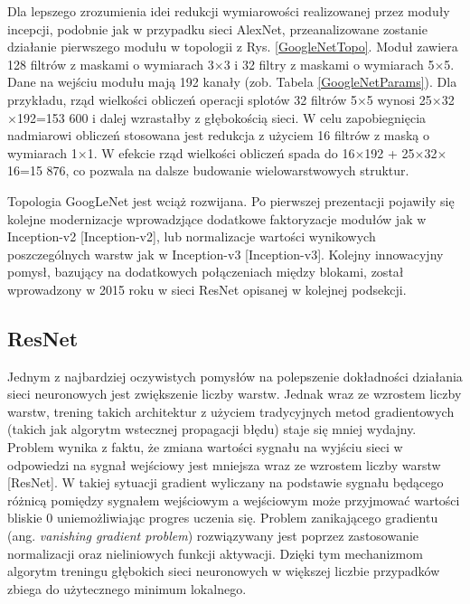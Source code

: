 Dla lepszego zrozumienia idei redukcji wymiarowości realizowanej przez moduły incepcji, podobnie jak w przypadku sieci AlexNet, przeanalizowane zostanie działanie pierwszego modułu w topologii z Rys. \ref{GoogleNetTopo}.
Moduł zawiera 128 filtrów z maskami o wymiarach 3$\times$3 i 32 filtry z maskami o wymiarach 5$\times$5. Dane na wejściu modułu mają 192 kanały (zob. Tabela \ref{GoogleNetParams}). Dla przykładu, rząd wielkości obliczeń operacji splotów 32 filtrów 5$\times$5 wynosi 25$\times$32$\times$192=153 600 i dalej wzrastałby z głębokością sieci. W celu zapobiegnięcia nadmiarowi obliczeń stosowana jest redukcja z użyciem 16 filtrów z maską o wymiarach 1$\times$1. W efekcie rząd wielkości obliczeń spada do 16$\times$192 +  25$\times$32$\times$16=15 876, co pozwala na dalsze budowanie wielowarstwowych struktur.

Topologia GoogLeNet jest wciąż rozwijana. Po pierwszej prezentacji pojawiły się kolejne modernizacje wprowadzjące dodatkowe faktoryzacje modułów jak w Inception-v2 [Inception-v2], lub normalizacje wartości wynikowych poszczególnych warstw jak w Inception-v3 [Inception-v3]. Kolejny innowacyjny pomysł, bazujący na dodatkowych połączeniach między blokami, został wprowadzony w 2015 roku w sieci ResNet opisanej w kolejnej podsekcji.

\subsection{ResNet}

Jednym z najbardziej oczywistych pomysłów na polepszenie dokładności działania sieci neuronowych jest zwiększenie liczby warstw. Jednak wraz ze wzrostem liczby warstw, trening takich architektur z użyciem tradycyjnych metod gradientowych (takich jak algorytm wstecznej propagacji błędu) staje się mniej wydajny. Problem wynika z faktu, że zmiana wartości sygnału na wyjściu sieci w odpowiedzi na sygnał wejściowy jest mniejsza wraz ze wzrostem liczby warstw [ResNet]. W takiej sytuacji gradient wyliczany na podstawie sygnału będącego różnicą pomiędzy sygnałem wejściowym a wejściowym może przyjmować wartości bliskie 0 uniemożliwiając progres uczenia się. Problem zanikającego gradientu (ang. \textit{vanishing gradient problem}) rozwiązywany jest poprzez zastosowanie normalizacji oraz nieliniowych funkcji aktywacji. Dzięki tym mechanizmom algorytm treningu głębokich sieci neuronowych w większej liczbie przypadków zbiega do użytecznego minimum lokalnego. 

